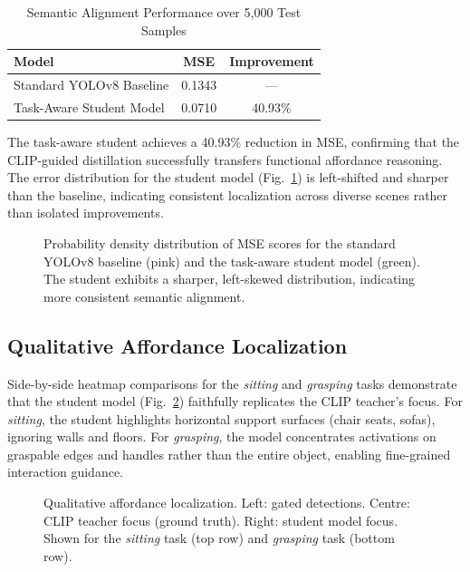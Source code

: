 \documentclass[conference]{IEEEtran}
\begin{document}
\begin{table}[htbp]
\caption{Semantic Alignment Performance over 5,000 Test Samples}
\label{tab:alignment}
\begin{center}
\begin{tabular}{lcc}
\toprule
\textbf{Model} & \textbf{MSE} & \textbf{Improvement} \\
\midrule
Standard YOLOv8 Baseline & 0.1343 & --- \\
Task-Aware Student Model & 0.0710 & 40.93\% \\
\bottomrule
\end{tabular}
\end{center}
\end{table}

The task-aware student achieves a 40.93\% reduction in MSE, confirming that the
CLIP-guided distillation successfully transfers functional affordance reasoning.
The error distribution for the student model (Fig.~\ref{fig:mse_dist}) is
left-shifted and sharper than the baseline, indicating consistent localization
across diverse scenes rather than isolated improvements.

\begin{figure}[htbp]
\centerline{\fbox{\rule{0pt}{3cm}\rule{8cm}{0pt}}}
\caption{Probability density distribution of MSE scores for the standard YOLOv8
baseline (pink) and the task-aware student model (green). The student exhibits a
sharper, left-skewed distribution, indicating more consistent semantic alignment.}
\label{fig:mse_dist}
\end{figure}

\subsection{Qualitative Affordance Localization}

Side-by-side heatmap comparisons for the \emph{sitting} and \emph{grasping} tasks
demonstrate that the student model (Fig.~\ref{fig:heatmaps}) faithfully replicates
the CLIP teacher's focus. For \emph{sitting}, the student highlights horizontal
support surfaces (chair seats, sofas), ignoring walls and floors. For
\emph{grasping}, the model concentrates activations on graspable edges and handles
rather than the entire object, enabling fine-grained interaction guidance.

\begin{figure}[htbp]
\centerline{\fbox{\rule{0pt}{3.5cm}\rule{8cm}{0pt}}}
\caption{Qualitative affordance localization. Left: gated detections. Centre: CLIP
teacher focus (ground truth). Right: student model focus. Shown for the
\emph{sitting} task (top row) and \emph{grasping} task (bottom row).}
\label{fig:heatmaps}
\end{figure}
\end{document}
